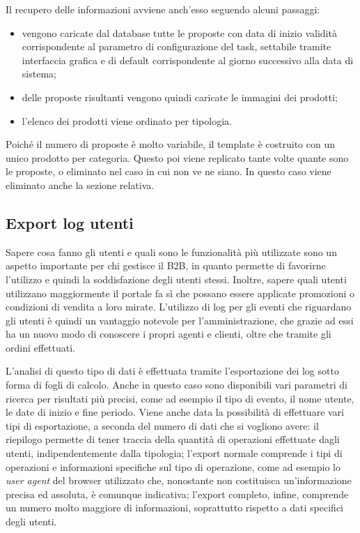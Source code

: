Il recupero delle informazioni avviene anch'esso seguendo alcuni passaggi:
\begin{itemize}
	\item vengono caricate dal database tutte le proposte con data di inizio validità corrispondente al parametro di configurazione del task, settabile tramite interfaccia grafica e di default corrispondente al giorno successivo alla data di sistema;
	\item delle proposte risultanti vengono quindi caricate le immagini dei prodotti;
	\item l'elenco dei prodotti viene ordinato per tipologia.
\end{itemize}
Poiché il numero di proposte è molto variabile, il template è costruito con un unico prodotto per categoria. Questo poi viene replicato tante volte quante sono le proposte, o eliminato nel caso in cui non ve ne siano. In questo caso viene eliminato anche la sezione relativa.


\subsection{Export log utenti}
Sapere cosa fanno gli utenti e quali sono le funzionalità più utilizzate sono un aspetto importante per chi gestisce il B2B, in quanto permette di favorirne l'utilizzo e quindi la soddisfazione degli utenti stessi. Inoltre, sapere quali utenti utilizzano maggiormente il portale fa sì che possano essere applicate promozioni o condizioni di vendita a loro mirate. L'utilizzo di log per gli eventi che riguardano gli utenti è quindi un vantaggio notevole per l'amministrazione, che grazie ad essi ha un nuovo modo di conoscere i propri agenti e clienti, oltre che tramite gli ordini effettuati.

L'analisi di questo tipo di dati è effettuata tramite l'esportazione dei log sotto forma di fogli di calcolo. Anche in questo caso sono disponibili vari parametri di ricerca per risultati più precisi, come ad esempio il tipo di evento, il nome utente, le date di inizio e fine periodo. Viene anche data la possibilità di effettuare vari tipi di esportazione, a seconda del numero di dati che si vogliono avere: il riepilogo permette di tener traccia della quantità di operazioni effettuate dagli utenti, indipendentemente dalla tipologia; l'export normale comprende i tipi di operazioni e informazioni specifiche sul tipo di operazione, come ad esempio lo \textit{user agent} del browser utilizzato che, nonostante non costituisca un'informazione precisa ed assoluta, è comunque indicativa; l'export completo, infine, comprende un numero molto maggiore di informazioni, soprattutto rispetto a dati specifici degli utenti.

